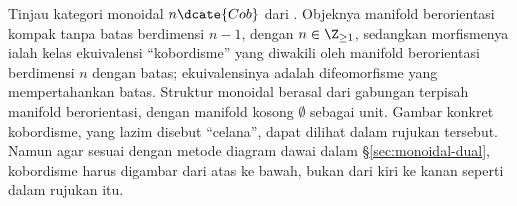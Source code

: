 \begin{example}[Kobordisme]
	Tinjau kategori monoidal $n\dcate{Cob}$ dari
	\cite[Contoh 3.1.4]{Li1}. Objeknya manifold berorientasi kompak tanpa
	batas berdimensi $n-1$, dengan $n\in\Z_{\geq1}$, sedangkan morfismenya
	ialah kelas ekuivalensi ``kobordisme'' yang diwakili oleh manifold
	berorientasi berdimensi $n$ dengan batas; ekuivalensinya adalah
	difeomorfisme yang mempertahankan batas. Struktur monoidal berasal dari
	gabungan terpisah manifold berorientasi, dengan manifold kosong
	$\emptyset$ sebagai unit. Gambar konkret kobordisme, yang lazim disebut
	``celana'', dapat dilihat dalam rujukan tersebut. Namun agar sesuai
	dengan metode diagram dawai dalam \S\ref{sec:monoidal-dual}, kobordisme
	harus digambar dari atas ke bawah, bukan dari kiri ke kanan seperti dalam
	rujukan itu.


\end{example}
